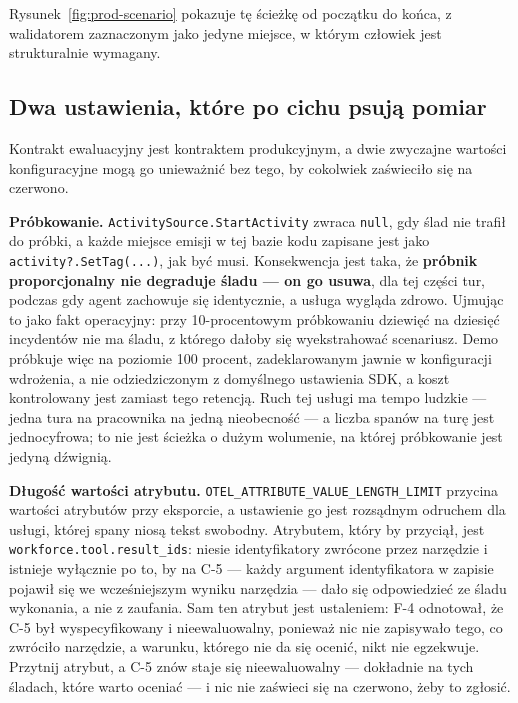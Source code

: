 \documentclass[11pt,a4paper]{article}
\newcommand{\finding}[1]{{\color{primaryblue}\textbf{#1}}}
\begin{document}
Rysunek~\ref{fig:prod-scenario} pokazuje tę ścieżkę od początku do końca, z walidatorem zaznaczonym jako jedyne miejsce, w którym człowiek jest strukturalnie wymagany.

\subsection{Dwa ustawienia, które po cichu psują pomiar}

Kontrakt ewaluacyjny jest kontraktem produkcyjnym, a dwie zwyczajne wartości konfiguracyjne mogą go unieważnić bez tego, by cokolwiek zaświeciło się na czerwono.

\textbf{Próbkowanie.} \texttt{ActivitySource.StartActivity} zwraca \texttt{null}, gdy ślad nie trafił do próbki, a każde miejsce emisji w tej bazie kodu zapisane jest jako \texttt{activity?.SetTag(...)}, jak być musi. Konsekwencja jest taka, że \finding{próbnik proporcjonalny nie degraduje śladu --- on go usuwa}, dla tej części tur, podczas gdy agent zachowuje się identycznie, a usługa wygląda zdrowo. Ujmując to jako fakt operacyjny: przy 10-procentowym próbkowaniu dziewięć na dziesięć incydentów nie ma śladu, z którego dałoby się wyekstrahować scenariusz. Demo próbkuje więc na poziomie 100 procent, zadeklarowanym jawnie w konfiguracji wdrożenia, a nie odziedziczonym z domyślnego ustawienia SDK, a koszt kontrolowany jest zamiast tego retencją. Ruch tej usługi ma tempo ludzkie --- jedna tura na pracownika na jedną nieobecność --- a liczba spanów na turę jest jednocyfrowa; to nie jest ścieżka o dużym wolumenie, na której próbkowanie jest jedyną dźwignią.

\textbf{Długość wartości atrybutu.} \texttt{OTEL\_ATTRIBUTE\_VALUE\_LENGTH\_LIMIT} przycina wartości atrybutów przy eksporcie, a ustawienie go jest rozsądnym odruchem dla usługi, której spany niosą tekst swobodny. Atrybutem, który by przyciął, jest \texttt{workforce.tool.result\_ids}: niesie identyfikatory zwrócone przez narzędzie i istnieje wyłącznie po to, by na C-5 --- każdy argument identyfikatora w zapisie pojawił się we wcześniejszym wyniku narzędzia --- dało się odpowiedzieć ze śladu wykonania, a nie z zaufania. Sam ten atrybut jest ustaleniem: F-4 odnotował, że C-5 był wyspecyfikowany i nieewaluowalny, ponieważ nic nie zapisywało tego, co zwróciło narzędzie, a warunku, którego nie da się ocenić, nikt nie egzekwuje. Przytnij atrybut, a C-5 znów staje się nieewaluowalny --- dokładnie na tych śladach, które warto oceniać --- i nic nie zaświeci się na czerwono, żeby to zgłosić.
\end{document}
